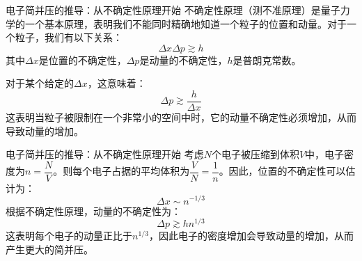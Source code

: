 \documentclass[10pt,aspectratio=1610]{beamer}
\begin{document}
\begin{frame}{电子简并压的推导：从不确定性原理开始}
    \textcolor{dia}{不确定性原理（测不准原理）}是量子力学的一个基本原理，表明\textcolor{mari}{我们不能同时精确地知道一个粒子的位置和动量}。对于一个粒子，我们有以下关系：
    \textcolor{mari}{
    \[
        \Delta x \Delta p \gtrsim h
    \]
    }
    其中$\Delta x$是位置的不确定性，$\Delta p$是动量的不确定性，$h$是普朗克常数。

    对于某个给定的$\Delta x$，这意味着：
    \[
        \Delta p \gtrsim \frac{h}{\Delta x}
    \]
    这表明当粒子被限制在一个非常小的空间中时，它的动量不确定性必须增加，从而导致动量的增加。
\end{frame}

\begin{frame}{电子简并压的推导：从不确定性原理开始}
    考虑$N$个电子被压缩到体积$V$中，电子密度为$n = \dfrac{N}{V}$。则每个电子占据的平均体积为$\dfrac{V}{N} = \dfrac{1}{n}$。因此，位置的不确定性可以估计为：
    \[
        \Delta x \sim n^{-1/3}
    \]
    根据不确定性原理，动量的不确定性为：
    \textcolor{dia}{
    \[
        \Delta p \gtrsim h n^{1/3}
    \]
    }
    这表明\textcolor{dia}{每个电子的动量正比于$n^{1/3}$}，因此电子的密度增加会导致动量的增加，从而产生更大的简并压。
\end{frame}
\end{document}
